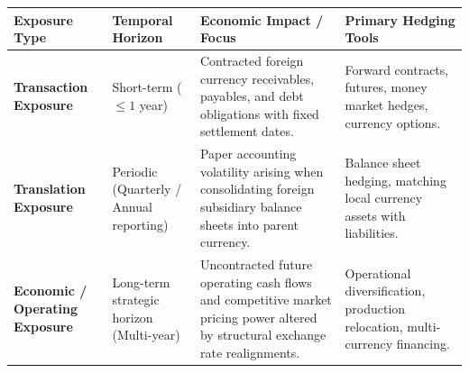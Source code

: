 \begin{center}
\small
\renewcommand{\arraystretch}{1.2}
\begin{tabularx}{\linewidth}{>{\raggedright\arraybackslash}p{3.2cm} >{\raggedright\arraybackslash}p{3.2cm} >{\raggedright\arraybackslash}X >{\raggedright\arraybackslash}p{3.0cm}}
\toprule
\textbf{Exposure Type} & \textbf{Temporal Horizon} & \textbf{Economic Impact / Focus} & \textbf{Primary Hedging Tools} \\
\midrule
\textbf{Transaction Exposure} & Short-term ($\le 1$ year) & Contracted foreign currency receivables, payables, and debt obligations with fixed settlement dates. & Forward contracts, futures, money market hedges, currency options. \\
\addlinespace
\textbf{Translation Exposure} & Periodic (Quarterly / Annual reporting) & Paper accounting volatility arising when consolidating foreign subsidiary balance sheets into parent currency. & Balance sheet hedging, matching local currency assets with liabilities. \\
\addlinespace
\textbf{Economic / Operating Exposure} & Long-term strategic horizon (Multi-year) & Uncontracted future operating cash flows and competitive market pricing power altered by structural exchange rate realignments. & Operational diversification, production relocation, multi-currency financing. \\
\bottomrule
\end{tabularx}
\end{center}
